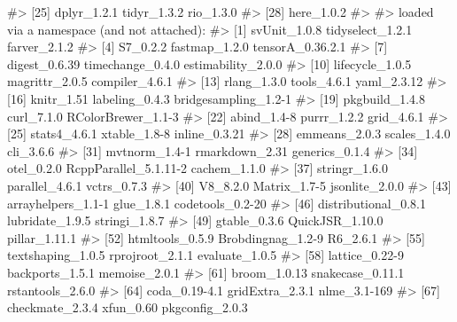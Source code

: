 \documentclass[
  italian,
  letterpaper,
  a4paper,
  11pt,
  open=any]{scrbook}
\newenvironment{Shaded}{\begin{snugshade}}{\end{snugshade}}
\newcommand{\CommentTok}[1]{\textcolor[rgb]{0.37,0.37,0.37}{#1}}
\theoremstyle{plain}
\theoremstyle{definition}
\theoremstyle{definition}
\theoremstyle{remark}
\begin{document}
\begin{tcolorbox}
\begin{Shaded}
\begin{Highlighting}[]
\CommentTok{\#\textgreater{} [25] dplyr\_1.2.1           tidyr\_1.3.2           rio\_1.3.0            }
\CommentTok{\#\textgreater{} [28] here\_1.0.2           }
\CommentTok{\#\textgreater{} }
\CommentTok{\#\textgreater{} loaded via a namespace (and not attached):}
\CommentTok{\#\textgreater{}  [1] svUnit\_1.0.8          tidyselect\_1.2.1      farver\_2.1.2         }
\CommentTok{\#\textgreater{}  [4] S7\_0.2.2              fastmap\_1.2.0         tensorA\_0.36.2.1     }
\CommentTok{\#\textgreater{}  [7] digest\_0.6.39         timechange\_0.4.0      estimability\_2.0.0   }
\CommentTok{\#\textgreater{} [10] lifecycle\_1.0.5       magrittr\_2.0.5        compiler\_4.6.1       }
\CommentTok{\#\textgreater{} [13] rlang\_1.3.0           tools\_4.6.1           yaml\_2.3.12          }
\CommentTok{\#\textgreater{} [16] knitr\_1.51            labeling\_0.4.3        bridgesampling\_1.2{-}1 }
\CommentTok{\#\textgreater{} [19] pkgbuild\_1.4.8        curl\_7.1.0            RColorBrewer\_1.1{-}3   }
\CommentTok{\#\textgreater{} [22] abind\_1.4{-}8           purrr\_1.2.2           grid\_4.6.1           }
\CommentTok{\#\textgreater{} [25] stats4\_4.6.1          xtable\_1.8{-}8          inline\_0.3.21        }
\CommentTok{\#\textgreater{} [28] emmeans\_2.0.3         scales\_1.4.0          cli\_3.6.6            }
\CommentTok{\#\textgreater{} [31] mvtnorm\_1.4{-}1         rmarkdown\_2.31        generics\_0.1.4       }
\CommentTok{\#\textgreater{} [34] otel\_0.2.0            RcppParallel\_5.1.11{-}2 cachem\_1.1.0         }
\CommentTok{\#\textgreater{} [37] stringr\_1.6.0         parallel\_4.6.1        vctrs\_0.7.3          }
\CommentTok{\#\textgreater{} [40] V8\_8.2.0              Matrix\_1.7{-}5          jsonlite\_2.0.0       }
\CommentTok{\#\textgreater{} [43] arrayhelpers\_1.1{-}1    glue\_1.8.1            codetools\_0.2{-}20     }
\CommentTok{\#\textgreater{} [46] distributional\_0.8.1  lubridate\_1.9.5       stringi\_1.8.7        }
\CommentTok{\#\textgreater{} [49] gtable\_0.3.6          QuickJSR\_1.10.0       pillar\_1.11.1        }
\CommentTok{\#\textgreater{} [52] htmltools\_0.5.9       Brobdingnag\_1.2{-}9     R6\_2.6.1             }
\CommentTok{\#\textgreater{} [55] textshaping\_1.0.5     rprojroot\_2.1.1       evaluate\_1.0.5       }
\CommentTok{\#\textgreater{} [58] lattice\_0.22{-}9        backports\_1.5.1       memoise\_2.0.1        }
\CommentTok{\#\textgreater{} [61] broom\_1.0.13          snakecase\_0.11.1      rstantools\_2.6.0     }
\CommentTok{\#\textgreater{} [64] coda\_0.19{-}4.1         gridExtra\_2.3.1       nlme\_3.1{-}169         }
\CommentTok{\#\textgreater{} [67] checkmate\_2.3.4       xfun\_0.60             pkgconfig\_2.0.3}
\end{Highlighting}
\end{Shaded}

\end{tcolorbox}
\end{document}
